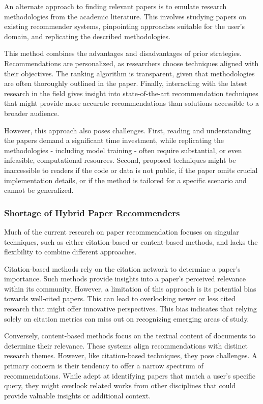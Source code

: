 An alternate approach to finding relevant papers is to emulate research methodologies from the academic literature.
This involves studying papers on existing recommender systems, pinpointing approaches suitable for the user's domain, and replicating the described methodologies.

This method combines the advantages and disadvantages of prior strategies.
Recommendations are personalized, as researchers choose techniques aligned with their objectives.
The ranking algorithm is transparent, given that methodologies are often thoroughly outlined in the paper.
Finally, interacting with the latest research in the field gives insight into state-of-the-art recommendation techniques that might provide more accurate recommendations than solutions accessible to a broader audience.

However, this approach also poses challenges.
First, reading and understanding the papers demand a significant time investment, while replicating the methodologies - including model training - often require substantial, or even infeasible, computational resources.
Second, proposed techniques might be inaccessible to readers if the code or data is not public, if the paper omits crucial implementation details, or if the method is tailored for a specific scenario and cannot be generalized.


\subsubsection*{Shortage of Hybrid Paper Recommenders}

Much of the current research on paper recommendation focuses on singular techniques, such as either citation-based or content-based methods, and lacks the flexibility to combine different approaches.

Citation-based methods \cite{GippSciensteinResearch2009,SugiyamaExploitingPotential2013,HabibSectionsbasedBibliographic2019,GippCitationProximity2009,KnothCanWe2017} rely on the citation network to determine a paper's importance.
Such methods provide insights into a paper's perceived relevance within its community. However, a limitation of this approach is its potential bias towards well-cited papers. This can lead to overlooking newer or less cited research that might offer innovative perspectives. This bias indicates that relying solely on citation metrics can miss out on recognizing emerging areas of study.

Conversely, content-based methods \cite{MassAdhocDocument2020,CohanSPECTERDocumentlevel2020,A.MohamedBERTELMo2019,BhagavatulaContentBasedCitation2018,AgarwalResearchPaper2005,NascimentoSourceIndependent2011} focus on the textual content of documents to determine their relevance.
These systems align recommendations with distinct research themes.
However, like citation-based techniques, they pose challenges. A primary concern is their tendency to offer a narrow spectrum of recommendations.
While adept at identifying papers that match a user's specific query, they might overlook related works from other disciplines that could provide valuable insights or additional context.

